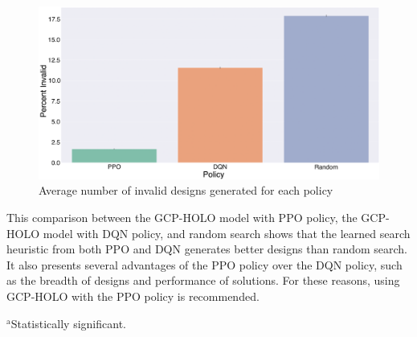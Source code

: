 \begin{figure}
    \centering
    \includegraphics[width=\linewidth]{11_figure_percent_invalid.png}
    \caption{Average number of invalid designs generated for each policy}
    \label{fig:ppo-invalid}
\end{figure}

This comparison between the GCP-HOLO model with PPO policy, the GCP-HOLO model with DQN policy, and random search shows that the learned search heuristic from both PPO and DQN generates better designs than random search. It also presents several advantages of the PPO policy over the DQN policy, such as the breadth of designs and performance of solutions. For these reasons, using GCP-HOLO with the PPO policy is recommended.

\begin{table}[h]
\centering
\caption{Comparison of GCP-HOLO with on-policy PPO policy, GCP-HOLO with off-policy DQN policy, and random policy on the number of designs generated in various linkage graph topologies}\label{tab:gcp:2}
\begin{flushleft}
\footnotesize{$^\text{a}$Statistically significant.}
\end{flushleft}
\end{table}

